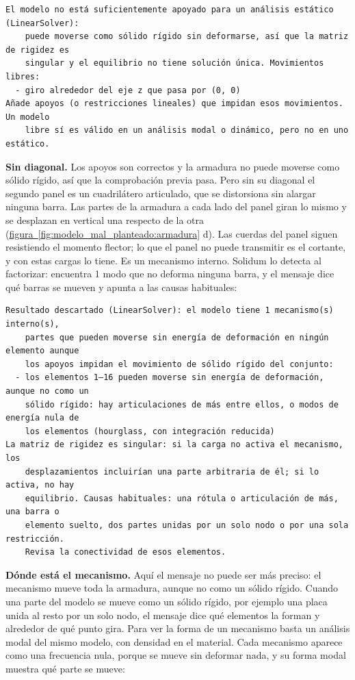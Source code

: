 \documentclass[11pt,oneside]{report}
\begin{document}
\begin{lstlisting}
El modelo no está suficientemente apoyado para un análisis estático (LinearSolver):
    puede moverse como sólido rígido sin deformarse, así que la matriz de rigidez es
    singular y el equilibrio no tiene solución única. Movimientos libres:
  - giro alrededor del eje z que pasa por (0, 0)
Añade apoyos (o restricciones lineales) que impidan esos movimientos. Un modelo
    libre sí es válido en un análisis modal o dinámico, pero no en uno estático.

\end{lstlisting}

\textbf{Sin diagonal.} Los apoyos son correctos y la armadura no puede moverse como sólido rígido, así que la comprobación previa pasa. Pero sin su diagonal el segundo panel es un cuadrilátero articulado, que se distorsiona sin alargar ninguna barra. Las partes de la armadura a cada lado del panel giran lo mismo y se desplazan en vertical una respecto de la otra (\hyperref[fig:modelo_mal_planteado:armadura]{figura~\ref*{fig:modelo_mal_planteado:armadura}} d). Las cuerdas del panel siguen resistiendo el momento flector; lo que el panel no puede transmitir es el cortante, y con estas cargas lo tiene. Es un mecanismo interno. Solidum lo detecta al factorizar: encuentra 1 modo que no deforma ninguna barra, y el mensaje dice qué barras se mueven y apunta a las causas habituales:

\begin{lstlisting}
Resultado descartado (LinearSolver): el modelo tiene 1 mecanismo(s) interno(s),
    partes que pueden moverse sin energía de deformación en ningún elemento aunque
    los apoyos impidan el movimiento de sólido rígido del conjunto:
  - los elementos 1–16 pueden moverse sin energía de deformación, aunque no como un
    sólido rígido: hay articulaciones de más entre ellos, o modos de energía nula de
    los elementos (hourglass, con integración reducida)
La matriz de rigidez es singular: si la carga no activa el mecanismo, los
    desplazamientos incluirían una parte arbitraria de él; si lo activa, no hay
    equilibrio. Causas habituales: una rótula o articulación de más, una barra o
    elemento suelto, dos partes unidas por un solo nodo o por una sola restricción.
    Revisa la conectividad de esos elementos.

\end{lstlisting}

\textbf{Dónde está el mecanismo.} Aquí el mensaje no puede ser más preciso: el mecanismo mueve toda la armadura, aunque no como un sólido rígido. Cuando una parte del modelo se mueve como un sólido rígido, por ejemplo una placa unida al resto por un solo nodo, el mensaje dice qué elementos la forman y alrededor de qué punto gira. Para ver la forma de un mecanismo basta un análisis modal del mismo modelo, con densidad en el material. Cada mecanismo aparece como una frecuencia nula, porque se mueve sin deformar nada, y su forma modal muestra qué parte se mueve:
\end{document}
